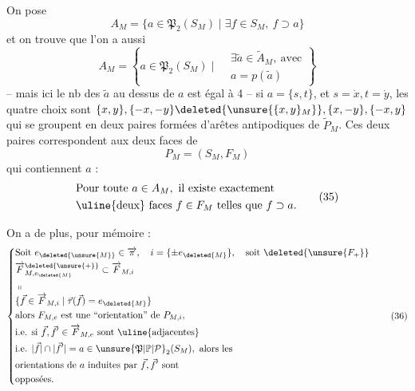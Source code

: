 On pose
\[
A_M=\{a\in\mathfrak P_2(S_M)\mid\exists f\in S_M,\ f\supset a\}\tag*{(33)}
\]
et on trouve que l'on a aussi
\[
A_M=\left\{a\in\mathfrak P_2(S_M)\mid
\begin{aligned}&\exists\widetilde a\in\widetilde A_M,\ \text{avec}\\
&a=p(\widetilde a)\end{aligned}\right\}\tag*{(34)}
\]
-- mais ici le nb des $\widetilde a$  au dessus de $a$
est égal à 4 -- si $a=\{s,t\}$, et
$s=\dot x,t=\dot y$, les quatre choix sont
$\{x,y\},\{-x,-y\}\deleted{\unsure{\{x,y\}_M}},\{x,-y\},\{-x,y\}$
qui se groupent en deux paires 
 formées d'arêtes antipodiques de $\widetilde{P}_M$.
Ces deux paires correspondent aux
deux faces de 
\[
P_M=(S_M,F_M)
\]
qui contiennent $a$ :
\[
\begin{aligned}
&\text{Pour toute }a\in A_M,\ \text{il existe exactement}\\
&\text{\uline{deux} faces } f\in F_M\ \text{telles que } f\supset a.
\end{aligned}\tag*{(35)}
\]

On a de plus, pour mémoire :
\[
\left\{\begin{aligned}
&\text{Soit } e_{\deleted{\unsure{M}}}\in\overrightarrow\pi,\quad i=\{\pm e_{\deleted{M}}\},\quad\text{soit }\deleted{\unsure{F_+}}\\
&\overrightarrow F_{M,e_{\deleted{M}}}^{\deleted{\unsure{+}}}\subset\overrightarrow F_{M,i}\\
&\shortparallel\\[-3pt]
&\{\vec f\in\overrightarrow F_{M,i}\mid\vec\tau(\vec f)=e_{\deleted{M}}\}\\
&\text{alors }F_{M,e}\text{ est une ``orientation'' de }P_{M,i},\\
&\text{i.e. si }\vec f,\vec f'\in\overrightarrow F_{M,e}\text{ sont \uline{adjacentes}}\\
&\text{i.e. }|\vec f|\cap|\vec f'|=a\in\unsure{\mathfrak P|\mathbb P|\mathcal P}_2(S_M),\ \text{alors les}\\
&\text{orientations de }a\text{ induites par }\vec f,\vec f'\text{ sont}\\
&\text{opposées}.
\end{aligned}\right.\tag*{(36)}
\]

